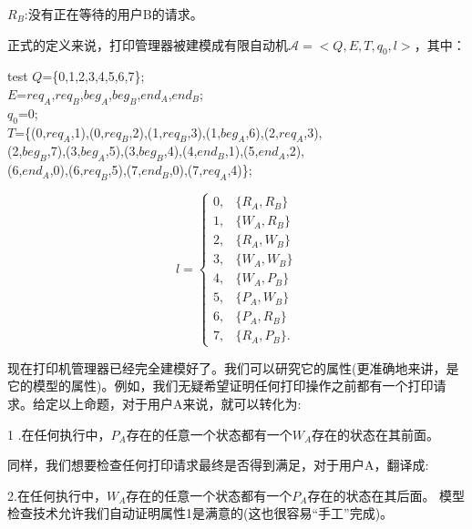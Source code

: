 \documentclass{book}
\begin{document}
    $R_B$:没有正在等待的用户B的请求。

    正式的定义来说，打印管理器被建模成有限自动机$\mathcal{A}=<Q,E,T,q_0,l>$，其中：
     \begin{tabbing}
      test  \kill
      $Q$=\{0,1,2,3,4,5,6,7\}; \\
      $E$={$req_A$,$req_B$,$beg_A$,$beg_B$,$end_A$,$end_B$}; \\
      $q_0$=0; \\
      $T$=\{(0,$req_A$,1),(0,$req_B$,2),(1,$req_B$,3),(1,$beg_A$,6),(2,$req_A$,3),\\
      \quad\quad (2,$beg_B$,7),(3,$beg_A$,5),(3,$beg_B$,4),(4,$end_B$,1),(5,$end_A$,2),\\
      \quad\quad (6,$end_A$,0),(6,$req_B$,5),(7,$end_B$,0),(7,$req_A$,4)\};\\

      \end{tabbing}
    \begin{flushleft}
      \begin{equation*}
        l=
        \begin{cases}
          0, & \{R_A,R_B\} \\
          1, & \{W_A,R_B\} \\
          2, & \{R_A,W_B\} \\
          3, & \{W_A,W_B\} \\
          4, & \{W_A,P_B\} \\
          5, & \{P_A,W_B\} \\
          6, & \{P_A,R_B\}\\
          7, & \{R_A,P_B\}.
        \end{cases}
      \end{equation*}
    \end{flushleft}



    现在打印机管理器已经完全建模好了。我们可以研究它的属性(更准确地来讲，是它的模型的属性)。例如，我们无疑希望证明任何打印操作之前都有一个打印请求。给定以上命题，对于用户A来说，就可以转化为:

1 .在任何执行中，$P_A$存在的任意一个状态都有一个$W_A$存在的状态在其前面。

    同样，我们想要检查任何打印请求最终是否得到满足，对于用户A，翻译成:

2.在任何执行中，$W_A$存在的任意一个状态都有一个$P_A$存在的状态在其后面。
    模型检查技术允许我们自动证明属性1是满意的(这也很容易“手工”完成)。
\end{document}
